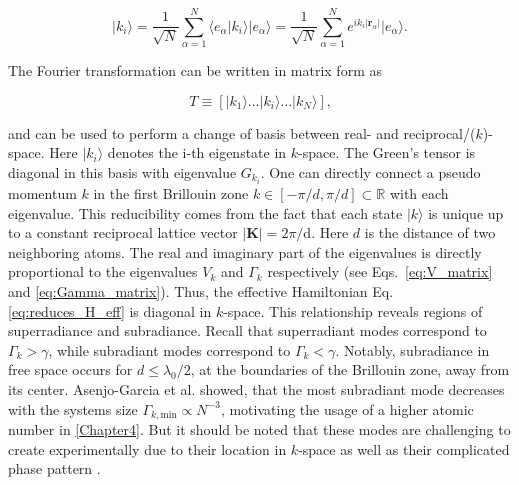 \begin{equation}
\vert k_i \rangle = \frac{1}{\sqrt{N}} \sum_{\alpha =1 }^{N} \langle e_\alpha \vert k_i \rangle  \vert e_\alpha \rangle
= \frac{1}{\sqrt{N}} \sum_{\alpha =1 }^{N} e^{i k_i |\mathbf{r}_{\alpha}|} \vert e_\alpha \rangle \text{.}
\end{equation}

\noindent
The Fourier transformation can be written in matrix form as

\begin{equation} \label{eq:FT}
T \equiv \left[\vert k_1 \rangle \dots \vert k_i \rangle \dots \vert k_N \rangle \right] \text{,}
\end{equation}

\noindent
and can be used to perform a change of basis between real- and reciprocal/($k$)-space.
Here $\vert k_i \rangle$ denotes the i-th eigenstate in $k$-space.
The Green's tensor is diagonal in this basis with eigenvalue $ G_{k_i} $.
One can directly connect a pseudo momentum $ k $ in the first Brillouin zone $ k \in [-\pi/d,\pi/d] \subset \mathbb{R} $ with each eigenvalue.
This reducibility comes from the fact that each state $ \vert k \rangle $ is unique up to a constant reciprocal lattice vector $\vert\mathbf{K}\vert = 2 \pi / \text{d}$.
Here $d$ is the distance of two neighboring atoms.
The real and imaginary part of the eigenvalues is directly proportional to the eigenvalues $ V_k $ and $ \Gamma_k $ respectively
(see Eqs.~\eqref{eq:V_matrix} and \eqref{eq:Gamma_matrix}).
Thus, the effective Hamiltonian Eq. \eqref{eq:reduces_H_eff}
is diagonal in $k$-space.
This relationship reveals regions of superradiance and subradiance.
Recall that superradiant modes correspond to \(\Gamma_k > \gamma\), while subradiant modes correspond to \(\Gamma_k < \gamma\).
Notably, subradiance in free space occurs for $d \leq \lambda_0/2$, at the boundaries of the Brillouin zone, away from its center.
Asenjo-Garcia et al. \cite{AsenjoGarcia2017} showed,
that the most subradiant mode decreases with the systems size $ \Gamma_{k, \text{min}} \propto N^{-3} $,
motivating the usage of a higher atomic number in \autoref{Chapter4}.
But it should be noted
that these modes are challenging
to create experimentally due to their location in \(k\)-space as well as their complicated phase pattern \cite{Cech2023}.



